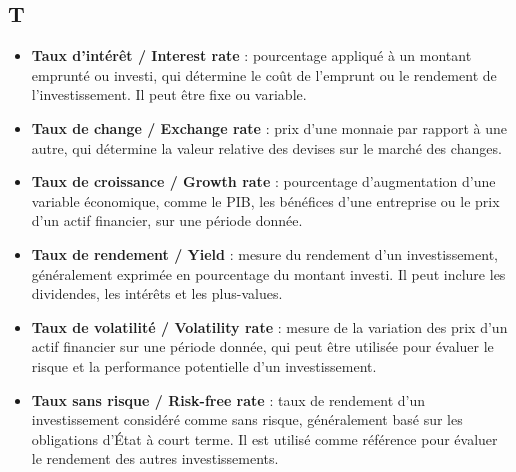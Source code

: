 \documentclass[a4paper,10pt]{article}
\begin{document}
\begin{multicols}{2}
\section*{T}
\begin{itemize}
  \item \textbf{Taux d’intérêt / Interest rate} : pourcentage appliqué à un montant emprunté ou investi, qui détermine le coût de l’emprunt ou le rendement de l’investissement. Il peut être fixe ou variable.
  \item \textbf{Taux de change / Exchange rate} : prix d’une monnaie par rapport à une autre, qui détermine la valeur relative des devises sur le marché des changes.
  \item \textbf{Taux de croissance / Growth rate} : pourcentage d’augmentation d’une variable économique, comme le PIB, les bénéfices d’une entreprise ou le prix d’un actif financier, sur une période donnée.
  \item \textbf{Taux de rendement / Yield} : mesure du rendement d’un investissement, généralement exprimée en pourcentage du montant investi. Il peut inclure les dividendes, les intérêts et les plus-values.
  \item \textbf{Taux de volatilité / Volatility rate} : mesure de la variation des prix d’un actif financier sur une période donnée, qui peut être utilisée pour évaluer le risque et la performance potentielle d’un investissement.
  \item \textbf{Taux sans risque / Risk-free rate} : taux de rendement d’un investissement considéré comme sans risque, généralement basé sur les obligations d’État à court terme. Il est utilisé comme référence pour évaluer le rendement des autres investissements.
\end{itemize}


\end{multicols}
\end{document}
